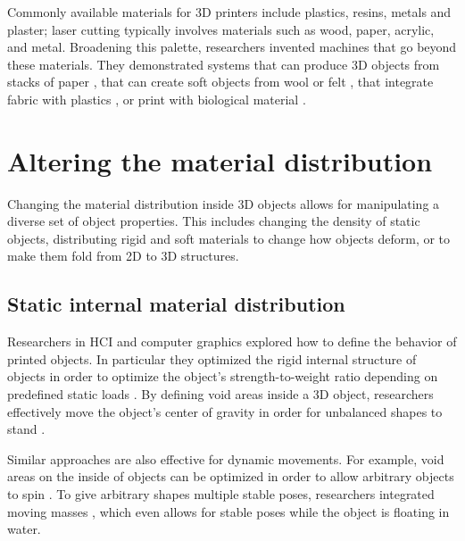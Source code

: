 Commonly available materials for 3D printers include plastics, resins, metals and plaster; laser cutting typically involves materials such as wood, paper, acrylic, and metal. Broadening this palette, researchers invented machines that go beyond these materials. They demonstrated systems that can produce 3D objects from stacks of paper \cite{Oh2018}, that can create soft objects from wool \cite{Hudson2014} or felt \cite{Peng2015}, that integrate fabric with plastics \cite{Rivera2017, Perez2017}, or print with biological material \cite{Wang2016, Yao2015a}.









\section{Altering the material distribution}

Changing the material distribution inside 3D objects allows for manipulating a diverse set of object properties. This includes changing the density of static objects, distributing rigid and soft materials to change how objects deform, or to make them fold from 2D to 3D structures.

\subsection{Static internal material distribution}
Researchers in HCI and computer graphics explored how to define the behavior of printed objects. In particular they optimized the rigid internal structure of objects in order to optimize the object’s strength-to-weight ratio depending on predefined static loads \cite{Lu2014, Chen2018, Wu2016}. By defining void areas inside a 3D object, researchers effectively move the object’s center of gravity in order for unbalanced shapes to stand \cite{Prevost2013}.

Similar approaches are also effective for dynamic movements. For example, void areas on the inside of objects can be optimized in order to allow arbitrary objects to spin \cite{Bacher2014a}. To give arbitrary shapes multiple stable poses, researchers integrated moving masses \cite{Prevost2016}, which even allows for stable poses while the object is floating in water.


